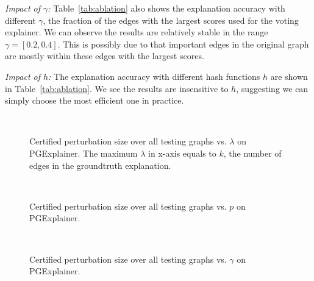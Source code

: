 \emph{Impact of $\gamma$:} Table~\ref{tab:ablation} also shows the explanation accuracy with different $\gamma$, the fraction of the edges with the largest scores used for the voting explainer. We  can observe the results are relatively stable in the range $\gamma=[0.2,0.4]$. This is possibly due to that important edges in the original graph are mostly within these edges with the largest scores. 

\emph{Impact of $h$:} The explanation accuracy with different hash functions $h$ are shown in Table~\ref{tab:ablation}. We see the results are insensitive to $h$, suggesting we can simply choose the most efficient one in practice. 

\begin{figure*}[!t]
	\centering
 \,
\,
	\caption{Certified perturbation size over all testing graphs vs. $\lambda$ on PGExplainer. The maximum $\lambda$ in x-axis equals to $k$, the number of edges in the groundtruth explanation.} 
	\label{fig:CEA_T_pge}
	 \vspace{-8mm}
\end{figure*}



\begin{figure*}[!t]
	\centering
 \,
\,
	\caption{Certified perturbation size over all testing graphs  vs. $p$ on PGExplainer.} 
	\vspace{-8mm}
	\label{fig:CEA_p_PG}
\end{figure*}


\begin{figure*}[!t]
	\centering
 \,
\,
	\caption{Certified perturbation size over all testing graphs vs. $\gamma$ on PGExplainer.} 
	\label{fig:CEA_gamma_PG}
	 \vspace{-4mm}
\end{figure*}

